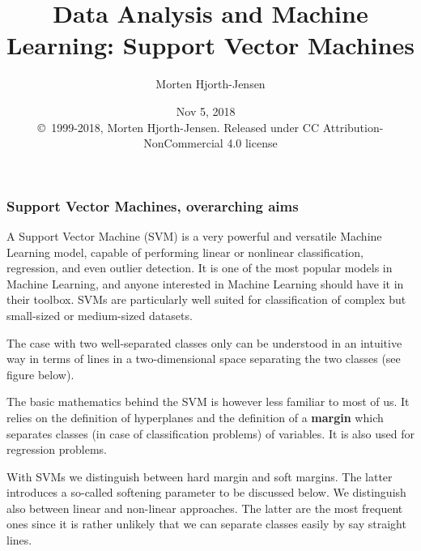 \documentclass{beamer}
\begin{document}

\newcommand{\exercisesection}[1]{\subsection*{#1}}







\title{Data Analysis and Machine Learning: Support Vector Machines}


\author{Morten Hjorth-Jensen}

\date{Nov 5, 2018
\ \\ 
{\tiny \copyright\ 1999-2018, Morten Hjorth-Jensen. Released under CC Attribution-NonCommercial 4.0 license}
}

\begin{frame}
\titlepage
\end{frame}

\begin{frame}
\frametitle{Support Vector Machines, overarching aims}

A Support Vector Machine (SVM) is a very powerful and versatile
Machine Learning model, capable of performing linear or nonlinear
classification, regression, and even outlier detection. It is one of
the most popular models in Machine Learning, and anyone interested in
Machine Learning should have it in their toolbox. SVMs are
particularly well suited for classification of complex but small-sized or
medium-sized datasets.  

The case with two well-separated classes only can be understood in an intuitive way in terms of lines in a two-dimensional space separating the two classes (see figure below).  

The basic mathematics behind the SVM is however less familiar to most of us. 
It relies on the definition of hyperplanes and the
definition of a \textbf{margin} which separates classes (in case of
classification problems) of variables. It is also used for regression
problems.

With SVMs we distinguish between hard margin and soft margins. The latter introduces a so-called softening parameter to be discussed below.
We distinguish also between linear and non-linear approaches. The latter are the most frequent ones since it is rather unlikely that we can separate classes easily by say straight lines.
\end{frame}
\end{document}
